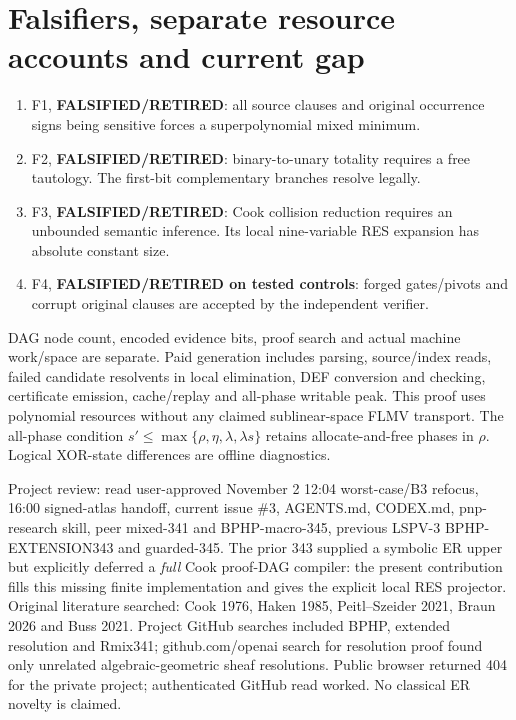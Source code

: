 \documentclass[11pt]{article}
\begin{document}
\section*{Falsifiers, separate resource accounts and current gap}
\begin{enumerate}
\item[] F1, \textbf{FALSIFIED/RETIRED}: all source clauses and original occurrence signs being sensitive forces a superpolynomial mixed minimum.
\item[] F2, \textbf{FALSIFIED/RETIRED}: binary-to-unary totality requires a free tautology. The first-bit complementary branches resolve legally.
\item[] F3, \textbf{FALSIFIED/RETIRED}: Cook collision reduction requires an unbounded semantic inference. Its local nine-variable RES expansion has absolute constant size.
\item[] F4, \textbf{FALSIFIED/RETIRED on tested controls}: forged gates/pivots and corrupt original clauses are accepted by the independent verifier.
\end{enumerate}
DAG node count, encoded evidence bits, proof search and actual machine work/space are separate. Paid generation includes parsing, source/index reads, failed candidate resolvents in local elimination, DEF conversion and checking, certificate emission, cache/replay and all-phase writable peak. This proof uses polynomial resources without any claimed sublinear-space FLMV transport. The all-phase condition $s'\le\max\{\rho,\eta,\lambda,\lambda s\}$ retains allocate-and-free phases in $\rho$. Logical XOR-state differences are offline diagnostics.

Project review: read user-approved November 2 12:04 worst-case/B3 refocus, 16:00 signed-atlas handoff, current issue \#3, AGENTS.md, CODEX.md, pnp-research skill, peer mixed-341 and BPHP-macro-345, previous LSPV-3 BPHP-EXTENSION343 and guarded-345. The prior 343 supplied a symbolic ER upper but explicitly deferred a \emph{full} Cook proof-DAG compiler: the present contribution fills this missing finite implementation and gives the explicit local RES projector. Original literature searched: Cook 1976, Haken 1985, Peitl--Szeider 2021, Braun 2026 and Buss 2021. Project GitHub searches included BPHP, extended resolution and Rmix341; github.com/openai search for resolution proof found only unrelated algebraic-geometric sheaf resolutions. Public browser returned 404 for the private project; authenticated GitHub read worked. No classical ER novelty is claimed.
\end{document}
